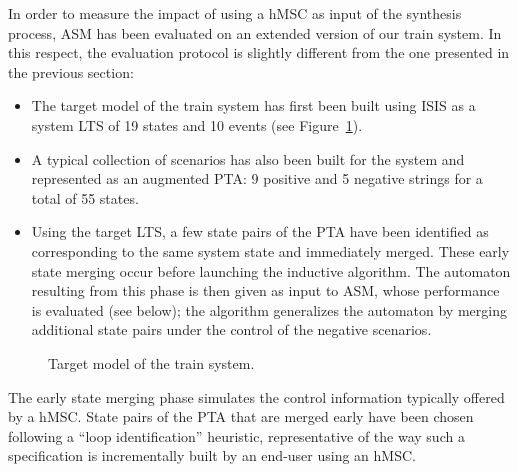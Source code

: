 In order to measure the impact of using a hMSC as input of the synthesis process, ASM has been evaluated on an extended version of our train system. In this respect, the evaluation protocol is slightly different from the one presented in the previous section: 
\begin{itemize}
\item The target model of the train system has first been built using ISIS as a system LTS of 19 states and 10 events (see Figure~\ref{image:case-studies-big-train-2}). 
\item A typical collection of scenarios has also been built for the system and represented as an augmented PTA: 9 positive and 5 negative strings for a total of 55 states.
\item Using the target LTS, a few state pairs of the PTA have been identified as corresponding to the same system state and immediately merged. These early state merging occur before launching the inductive algorithm. The automaton resulting from this phase is then given as input to ASM, whose performance is evaluated (see below); the algorithm generalizes the automaton by merging additional state pairs under the control of the negative scenarios.
\end{itemize}

\begin{figure}
\centering
{}
\caption{Target model of the train system.\label{image:case-studies-big-train-2}}
\end{figure}

The early state merging phase simulates the control information typically offered by a hMSC. State pairs of the PTA that are merged early have been chosen following a ``loop identification'' heuristic, representative of the way such a specification is incrementally built by an end-user using an hMSC. 

